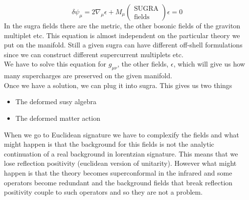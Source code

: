 \documentclass[11pt]{article}
\theoremstyle{definition}
\numberwithin{equation}{section}
\begin{document}
\begin{equation}
	\delta \psi_{\mu} = 2\nabla_{\mu}\epsilon + M_{\mu}(\substack{\text{SUGRA}\\\text{fields}})\epsilon=0
\end{equation}
In the sugra fields there are the metric, the other bosonic fields of the graviton multiplet etc. This equation is almost independent on the particular theory we put on the manifold. Still a given sugra can have different off-shell formulations since we can construct different supercurrent multiplets etc.\\
We have to solve this equation for $g_{\mu\nu}$, the other fields, $\epsilon$, which will give us how many supercharges are preserved on the given manifold.\\
Once we have a solution, we can plug it into sugra. This gives us two things
\begin{itemize}
	\item The deformed susy algebra
	\item The deformed matter action
\end{itemize}
When we go to Euclidean signature we have to complexify the fields and what might happen is that the background for this fields is not the analytic continuation of a real background in lorentzian signature. This means that we lose reflection positivity (euclidean version of unitarity). However what might happen is that the theory becomes superconformal in the infrared and some operators become redundant and the background fields that break reflection positivity couple to such operators and so they are not a problem.\\
\end{document}
